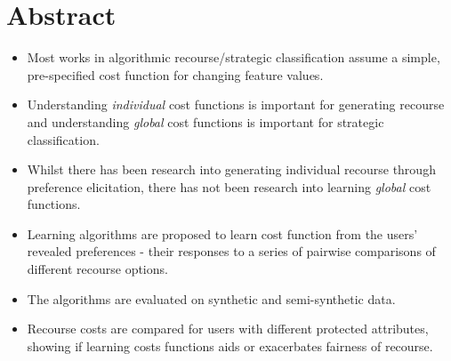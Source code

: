 \clearpage
{
    \pagestyle{abstract}
    \chapter*{Abstract}
    \begin{itemize}
    	\item Most works in algorithmic recourse/strategic classification assume a simple, pre-specified cost function for changing feature values.
    	\item Understanding \textit{individual} cost functions is important for generating recourse and understanding \textit{global} cost functions is important for strategic classification.
    	\item Whilst there has been research into generating individual recourse through preference elicitation, there has not been research into learning \textit{global} cost functions.
    	\item Learning algorithms are proposed to learn cost function from the users' revealed preferences - their responses to a series of pairwise comparisons of different recourse options.
    	\item The algorithms are evaluated on synthetic and semi-synthetic data.
    	\item Recourse costs are compared for users with different protected attributes, showing if learning costs functions aids or exacerbates fairness of recourse.
    \end{itemize}
    \thispagestyle{abstract}
}
\newpage



